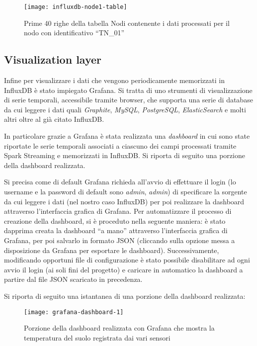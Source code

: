 \clearpage

\begin{figure}[ht]
\centering
\texttt{[image: influxdb-node1-table]}
\caption{Prime 40 righe della tabella Nodi contenente i dati processati per il nodo con identificativo ``TN\_01''}
\label{fig:influxdb-node1-table}
\end{figure}

\clearpage

\subsection{Visualization layer}
Infine per visualizzare i dati che vengono periodicamente memorizzati in InfluxDB è stato impiegato Grafana. Si tratta di uno strumenti di visualizzazione di serie temporali, accessibile tramite browser, che supporta una serie di database da cui leggere i dati quali \textit{Graphite}, \textit{MySQL}, \textit{PostgreSQL}, \textit{ElasticSearch} e molti altri oltre al già citato InfluxDB.\par

In particolare grazie a Grafana è stata realizzata una \textit{dashboard} in cui sono state riportate le serie temporali associati a ciascuno dei campi processati tramite Spark Streaming e memorizzati in InfluxDB. Si riporta di seguito una porzione della dashboard realizzata. \par

Si precisa come di default Grafana richieda all'avvio di effettuare il login (lo username e la password di default sono \textit{admin}, \textit{admin}) di specificare la sorgente da cui leggere i dati (nel nostro caso InfluxDB) per poi realizzare la dashboard attraverso l'interfaccia grafica di Grafana. Per automatizzare il processo di creazione della dashboard, si è proceduto nella seguente maniera: è stato dapprima creata la dashboard ``a mano'' attraverso l'interfaccia grafica di Grafana, per poi salvarlo in formato JSON (cliccando sulla opzione messa a disposizione da Grafana per esportare le dashboard). Successivamente, modificando opportuni file di configurazione è stato possibile disabilitare ad ogni avvio il login (ai soli fini del progetto) e caricare in automatico la dashboard a partire dal file JSON scaricato in precedenza.\par

Si riporta di seguito una istantanea di una porzione della dashboard realizzata:

\begin{figure}[ht]
\centering
\texttt{[image: grafana-dashboard-1]}
\caption{Porzione della dashboard realizzata con Grafana che mostra la temperatura del suolo registrata dai vari sensori}
\label{fig:grafana-dashboard-1}
\end{figure}

